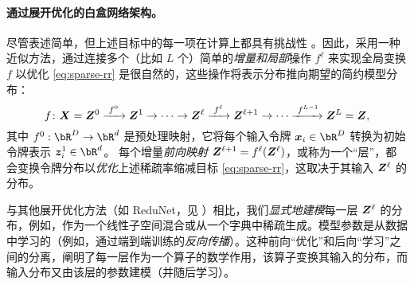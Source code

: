 \documentclass[../../book-main_zh.tex]{subfiles}
\begin{document}
\paragraph{通过展开优化的白盒网络架构。}


尽管表述简单，但上述目标中的每一项在计算上都具有挑战性 \cite{Wright-Ma-2022}。因此，采用一种近似方法，通过连接多个（比如 $L$ 个）简单的\textit{增量和局部}操作 $f^\ell$ 来实现全局变换 $f$ 以优化 \eqref{eq:sparse-rr} 是很自然的，这些操作将表示分布推向期望的简约模型分布：
\begin{equation}
f\colon \bm{X} = \bm Z^0 \xrightarrow{\hspace{1mm} f^0 \hspace{1mm}} \bm{Z}^1 \rightarrow \cdots \rightarrow \bm{Z}^\ell \xrightarrow{\hspace{1mm} f^{\ell} \hspace{1mm}} \bm{Z}^{\ell+1} \rightarrow  \cdots \xrightarrow{\hspace{1mm} f^{L-1}} \bm{Z}^L = \bm{Z},
\label{eq:incremental}
\end{equation}
其中 $f^0: \bR^{D} \rightarrow \bR^{d}$ 是预处理映射，它将每个输入令牌 $\x_{i} \in \bR^{D}$ 转换为初始令牌表示 $\z_{i}^{1} \in \bR^{d}$。
每个增量\textit{前向映射} $\bm{Z}^{\ell + 1} = f^\ell(\bm{Z}^\ell)$，或称为一个“层”，都会变换令牌分布以\textit{优化}上述稀疏率缩减目标 \eqref{eq:sparse-rr}，这取决于其输入 $\bm{Z}^\ell$ 的分布。

\begin{remark}
    与其他展开优化方法（如 ReduNet，见 ）相比，我们\textit{显式地建模}每一层 $\bm{Z}^\ell$ 的分布，例如，作为一个线性子空间混合或从一个字典中稀疏生成。模型参数是从数据中学习的（例如，通过端到端训练的\textit{反向传播}）。这种前向“优化”和后向“学习”之间的分离，阐明了每一层作为一个算子的数学作用，该算子变换其输入的分布，而输入分布又由该层的参数建模（并随后学习）。
\end{remark}
\end{document}
